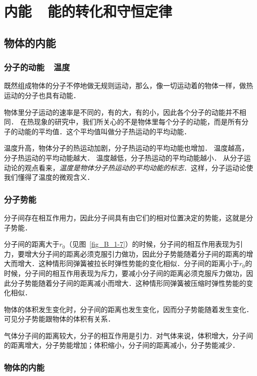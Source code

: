 \chapter{内能~~能的转化和守恒定律}\label{chapter-internal-energy-and-laws-of-conversion-and-conservation-of-sssenergy}


\section{物体的内能}
\subsection{分子的动能~~温度}
既然组成物体的分子不停地做无规则运动，那么，像一切运动着的物体一样，做热运动的分子也具有动能．

物体里分子运动的速率是不同的，有的大，有的小，因此各个分子的动能并不相同．
在热现象的研究中，我们所关心的不是物体里每个分子的动能，而是所有分子的动能的平均值．这个平均值叫做分子热运动的平均动能．

温度升高，物体分子的热运动加剧，分子热运动的平均动能也增加．
温度越高，分子热运动的平均动能越大．
温度越低，分子热运动的平均动能越小．
从分子运动论的观点看来，\textit{温度是物体分子热运动的平均动能的标志}．这样，分子运动论使我们懂得了温度的微观含义．

\subsection{分子势能} 

分子间存在相互作用力，因此分子间具有由它们的相对位置决定的势能，这就是分子势能．

分子间的距离大于$r_0$（见图~\ref{fig_B_1-7}）的时候，分子间的相互作用表现为引力，要增大分子间的距离必须克服引力做功，因此分子势能随着分子间的距离的增大而增大．这种情形同弹簧被拉长时弹性势能的变化相似．分子间的距离小于$r_0$的
时候，分子间的相互作用表现为斥力，要减小分子间的距离必须克服斥力做功，因此分子势能随着分子间的距离减小而增大．这种情形同弹簧被压缩时弹性势能的变化相似．

物体的体积发生变化时，分子间的距离也发生变化，因而分子势能随着发生变化．可见分子势能跟物体的体积有关系．

气体分子间的距离较大，分子的相互作用是引力．对气体来说，体积增大，分子间的距离增大，分子势能增加；体积缩小，分子间的距离减小，分子势能减少．

\subsection{物体的内能} 

